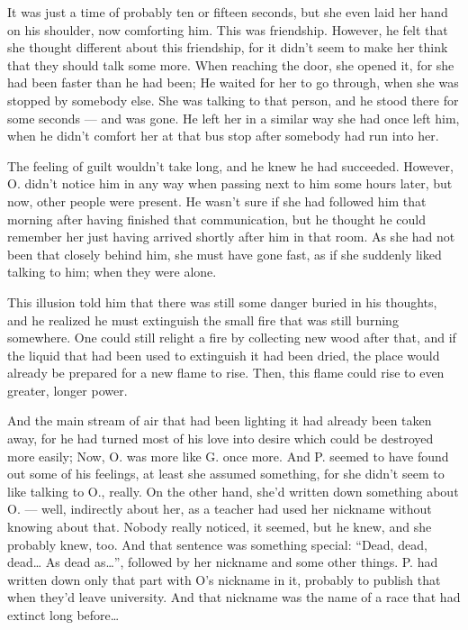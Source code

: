 It was just a time of probably ten or fifteen seconds, but she even laid her hand on his shoulder, now comforting him. This was friendship. 
However, he felt that she thought different about this friendship, for it didn't seem to make her think that they should talk some more. When reaching the door, she opened it, for she had been faster than he had been; He waited for her to go through, when she was stopped by somebody else. She was talking to that person, and he stood there for some seconds --- and was gone. 
He left her in a similar way she had once left him, when he didn't comfort her at that bus stop after somebody had run into her.

The feeling of guilt wouldn't take long, and he knew he had succeeded. However, O. didn't notice him in any way when passing next to him some hours later, but now, other people were present. He wasn't sure if she had followed him that morning after having finished that communication, but he thought he could remember her just having arrived shortly after him in that room. As she had not been that closely behind him, she must have gone fast, as if she suddenly liked talking to him; when they were alone.

This illusion told him that there was still some danger buried in his thoughts, and he realized he must extinguish the small fire that was still burning somewhere. 
One could still relight a fire by collecting new wood after that, and if the liquid that had been used to extinguish it had been dried, the place would already be prepared for a new flame to rise. Then, this flame could rise to even greater, longer power.

And the main stream of air that had been lighting it had already been taken away, for he had turned most of his love into desire which could be destroyed more easily; Now, O. was more like G. once more. 
And P. seemed to have found out some of his feelings, at least she assumed something, for she didn't seem to like talking to O., really. On the other hand, she'd written down something about O. --- well, indirectly about her, as a teacher had used her nickname without knowing about that. Nobody really noticed, it seemed, but he knew, and she probably knew, too. And that sentence was something special: \enquote{Dead, dead, dead\dots{} As dead as\dots{}}, followed by her nickname and some other things. P. had written down only that part with O's nickname in it, probably to publish that when they'd leave university. And that nickname was the name of a race that had extinct long before\dots{}

